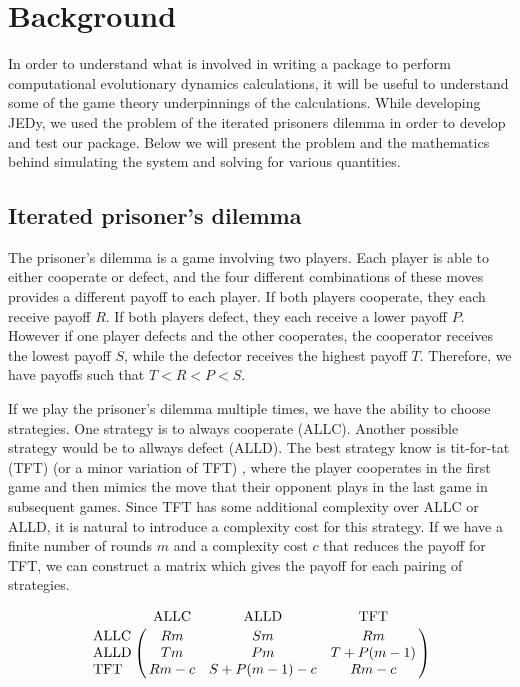 \section{Background}

In order to understand what is involved in writing a package to perform computational evolutionary dynamics calculations, it will be useful to understand some of the game theory underpinnings of the calculations.
While developing JEDy, we used the problem of the iterated prisoners dilemma in order to develop and test our package.
Below we will present the problem and the mathematics behind simulating the system and solving for various quantities.

\subsection{Iterated prisoner's dilemma}

The prisoner's dilemma is a game involving two players.
Each player is able to either cooperate or defect, and the four different combinations of these moves provides a different payoff to each player.
If both players cooperate, they each receive payoff $R$.
If both players defect, they each receive a lower payoff $P$.
However if one player defects and the other cooperates, the cooperator receives the lowest payoff $S$, while the defector receives the highest payoff $T$.
Therefore, we have payoffs such that $T < R < P < S$.

If we play the prisoner's dilemma multiple times, we have the ability to choose strategies.
One strategy is to always cooperate (ALLC).
Another possible strategy would be to allways defect (ALLD).
The best strategy know is tit-for-tat (TFT) (or a minor variation of TFT) \cite{nowaksigmund93}, where the player cooperates in the first game and then mimics the move that their opponent plays in the last game in subsequent games.
Since TFT has some additional complexity over ALLC or ALLD, it is natural to introduce a complexity cost for this strategy.
If we have a finite number of rounds $m$ and a complexity cost $c$ that reduces the payoff for TFT, we can construct a matrix which gives the payoff for each pairing of strategies.

\begin{equation*}
    \bordermatrix{
        ~ & \text{ALLC} & \text{ALLD} & \text{TFT} \cr
        \text{ALLC} & Rm & Sm & Rm \cr
        \text{ALLD} & Tm & Pm & T + P(m - 1) \cr
        \text{TFT} & Rm - c & S + P(m-1) - c & Rm - c \cr
    }
\end{equation*}

